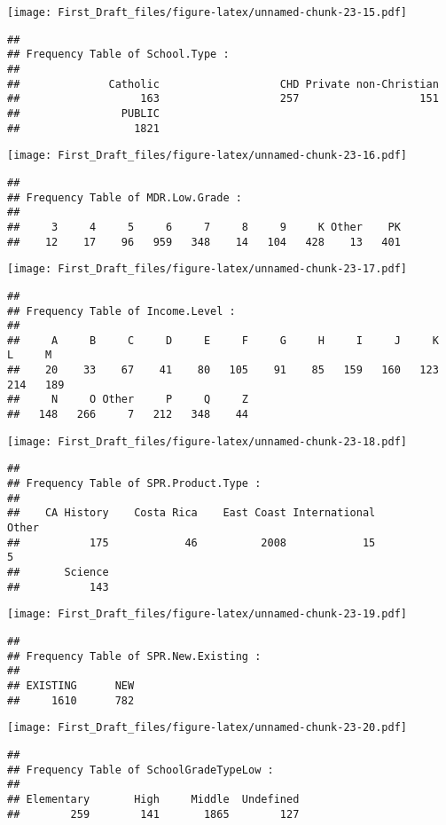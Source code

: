 \documentclass[
]{article}
\begin{document}
\texttt{[image: First\_Draft\_files/figure-latex/unnamed-chunk-23-15.pdf]}

\begin{verbatim}
## 
## Frequency Table of School.Type :
## 
##              Catholic                   CHD Private non-Christian 
##                   163                   257                   151 
##                PUBLIC 
##                  1821
\end{verbatim}

\texttt{[image: First\_Draft\_files/figure-latex/unnamed-chunk-23-16.pdf]}

\begin{verbatim}
## 
## Frequency Table of MDR.Low.Grade :
## 
##     3     4     5     6     7     8     9     K Other    PK 
##    12    17    96   959   348    14   104   428    13   401
\end{verbatim}

\texttt{[image: First\_Draft\_files/figure-latex/unnamed-chunk-23-17.pdf]}

\begin{verbatim}
## 
## Frequency Table of Income.Level :
## 
##     A     B     C     D     E     F     G     H     I     J     K     L     M 
##    20    33    67    41    80   105    91    85   159   160   123   214   189 
##     N     O Other     P     Q     Z 
##   148   266     7   212   348    44
\end{verbatim}

\texttt{[image: First\_Draft\_files/figure-latex/unnamed-chunk-23-18.pdf]}

\begin{verbatim}
## 
## Frequency Table of SPR.Product.Type :
## 
##    CA History    Costa Rica    East Coast International         Other 
##           175            46          2008            15             5 
##       Science 
##           143
\end{verbatim}

\texttt{[image: First\_Draft\_files/figure-latex/unnamed-chunk-23-19.pdf]}

\begin{verbatim}
## 
## Frequency Table of SPR.New.Existing :
## 
## EXISTING      NEW 
##     1610      782
\end{verbatim}

\texttt{[image: First\_Draft\_files/figure-latex/unnamed-chunk-23-20.pdf]}

\begin{verbatim}
## 
## Frequency Table of SchoolGradeTypeLow :
## 
## Elementary       High     Middle  Undefined 
##        259        141       1865        127
\end{verbatim}
\end{document}
